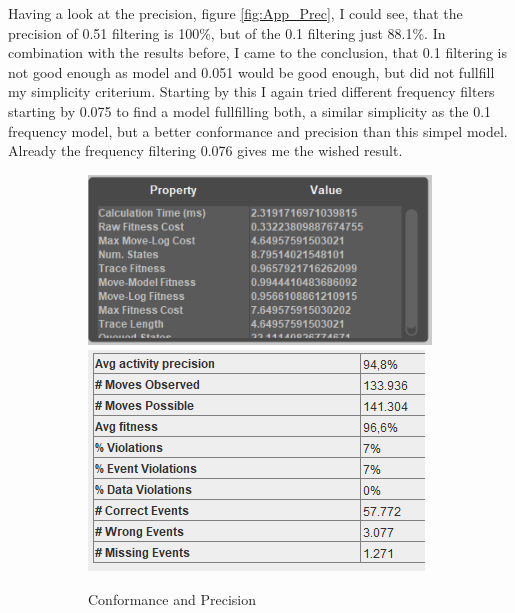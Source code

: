 Having a look at the precision, figure \ref{fig:App_Prec}, I could see, that the precision of 0.51 filtering is 100\%, but of the 0.1 filtering just 88.1\%. In combination with the results before, I came to the conclusion, that 0.1 filtering is not good enough as model and 0.051 would be good enough, but did not fullfill my simplicity criterium. Starting by this I again tried different frequency filters starting by 0.075 to find a model fullfilling both, a similar simplicity as the 0.1 frequency model, but a better conformance and precision than this simpel model. Already the frequency filtering 0.076 gives me the wished result.

\begin{figure}[!htbp]
\centering
\begin{subfigure}{.4\textwidth}
  \centering
  \includegraphics[width=\linewidth]{App_Conformance0-076.PNG}
  \includegraphics[width=\linewidth]{App_Precision0-076.PNG}
  \caption{Conformance and Precision}
  \label{fig:APP_Conf0-076}
\end{subfigure}
\begin{subfigure}{0.5\textwidth}

\end{subfigure}
\end{figure}
